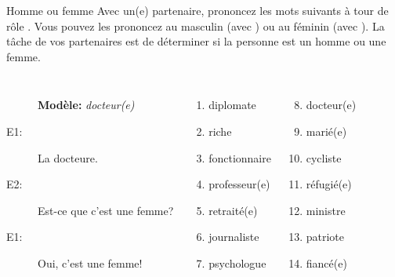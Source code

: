 \begin{frame}{Homme ou femme}
  Avec un(e) partenaire, prononcez les mots suivants à tour de rôle .
  Vous pouvez les prononcez au masculin (avec ) ou au féminin (avec ).
  La tâche de vos partenaires est de déterminer si la personne est un homme ou une femme.
  \begin{columns}
      \begin{description}
        \item[] \textbf{Modèle:} \emph{docteur(e)}
        \item[E1:] La docteure.
        \item[E2:] Est-ce que c'est une femme?
        \item[E1:] Oui, c'est une femme!
      \end{description}
      \begin{enumerate}
        \item diplomate
        \item riche
        \item fonctionnaire
        \item professeur(e)
        \item retraité(e)
        \item journaliste
        \item psychologue
      \end{enumerate}
      \begin{enumerate}
        \setcounter{enumi}{7}
        \item docteur(e)
        \item marié(e)
        \item cycliste
        \item réfugié(e)
        \item ministre
        \item patriote
        \item fiancé(e)
      \end{enumerate}
  \end{columns}
\end{frame}
